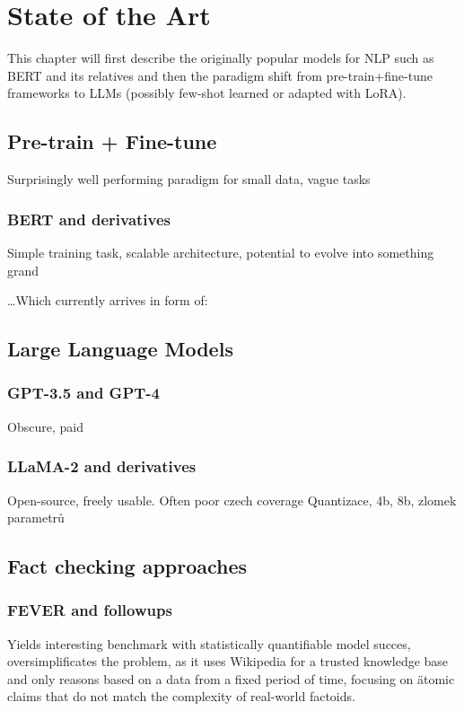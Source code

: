 
\chapter{State of the Art}
This chapter will first describe the originally popular models for NLP such as BERT and its relatives and then the paradigm shift from pre-train+fine-tune frameworks to LLMs (possibly few-shot learned or adapted with LoRA). 

\label{chap:sota}
\section{Pre-train + Fine-tune}
\label{sec:pretrain}
Surprisingly well performing paradigm for small data, vague tasks
\subsection{BERT and derivatives}
Simple training task, scalable architecture, potential to evolve into something grand

\dots Which currently arrives in form of:

\section{Large Language Models}
\label{sec:llms}
\subsection{GPT-3.5 and GPT-4}
\label{sec:gpt}
Obscure, paid
\subsection{LLaMA-2 and derivatives}
\label{sec:llama}
Open-source, freely usable.
Often poor czech coverage 
Quantizace, 4b, 8b, zlomek parametrů

\section{Fact checking approaches}
\subsection{FEVER and followups}
Yields interesting benchmark with statistically quantifiable model succes, oversimplificates the problem, as it uses Wikipedia for a trusted knowledge base and only reasons based on a data from a fixed period of time, focusing on \"{atomic} claims that do not match the complexity of real-world factoids.
